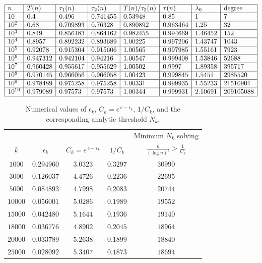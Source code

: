 \documentclass[11pt]{article}
\theoremstyle{definition}
\theoremstyle{remark}
\numberwithin{equation}{section}
\begin{document}
\begin{table}[h]
$$\begin{array}{|l|l|l|l|l|l|l|l|}
\hline
n & T(n) & \tau_1(n) & \tau_2(n) & T(n)/\tau_2(n) & \tau(n) & \lambda_0 & \text{degree}\\
\hline 
10 &  0.4 & 0.496 & 0.741455 & 0.53948 & 0.85 & 1 & 7\\
\hline
10^2 & 0.68 & 0.709893 & 0.76328 & 0.890892 & 0.963464 & 1.25 & 32\\
\hline
10^3 & 0.849 & 0.856183 & 0.864162 & 0.982455 & 0.994669 & 1.46452 & 152\\
\hline
10^4 & 0.8957 & 0.892232 & 0.893689 & 1.00225 & 0.997206 & 1.43747 & 1043\\
\hline
10^5 & 0.92078 & 0.915304 & 0.915606 & 1.00565 & 0.997985 & 1.55161 & 7923\\
\hline
10^6 & 0.947312 & 0.942104 & 0.94216 & 1.00547 & 0.999408 & 1.53846 & 52688\\
\hline
10^7 & 0.960428 & 0.955617 & 0.955629 & 1.00502 & 0.9997 & 1.89358 & 395717\\
\hline 
10^8 & 0.970145 & 0.966056 & 0.966058 & 1.00423 & 0.999845 & 1.5451 & 2985520\\
\hline
10^9 & 0.978489 & 0.975258 & 0.975258 & 1.00331 & 0.999935 & 1.55233 & 21510901\\
\hline
10^{10} & 0.979089 & 0.97573 & 0.97573 & 1.00344 & 0.999931 & 2.10691 & 209105088\\
\hline
\end{array}$$
\caption{Values of $T(n)$, $\tau_1(n),\tau_2(n),\tau(n)$, $\lambda_0$ and degree$(x)$ for $x=12n+10$.}\label{tabtetan10}
\end{table}

\begin{table}[h]
\centering
\begin{tabular}{|c|c|c|c|c|}
\hline
 & & & & Minimum $N_k$ solving \\
$k$ & $\epsilon_k$ & $C_k = e^{\,c-\epsilon_k}$ & $1/C_k$ & $\displaystyle \frac{n}{(\log n)^5} > \frac{1}{C_k}$ \\
\hline
$1000$  & $0.294960$ & $3.0323$ & $0.3297$ & $30990$ \\
$3000$  & $0.126037$ & $4.4726$ & $0.2236$ & $22695$ \\
$5000$  & $0.084893$ & $4.7998$ & $0.2083$ & $20744$ \\
$10000$ & $0.056001$ & $5.0286$ & $0.1989$ & $19552$ \\
$15000$ & $0.042480$ & $5.1644$ & $0.1936$ & $19140$ \\
$18000$ & $0.036776$ & $4.8902$ & $0.2045$ & $18964$ \\
$20000$ & $0.033789$ & $5.2638$ & $0.1899$ & $18840$ \\
$25000$ & $0.028092$ & $5.3407$ & $0.1873$ & $18694$ \\
\hline
\end{tabular}
\caption{Numerical values of $\epsilon_k$, $C_k = e^{\,c-\epsilon_k}$, $1/C_k$, 
and the corresponding analytic threshold $N_k$.}\label{ktable}
\end{table}
\end{document}
